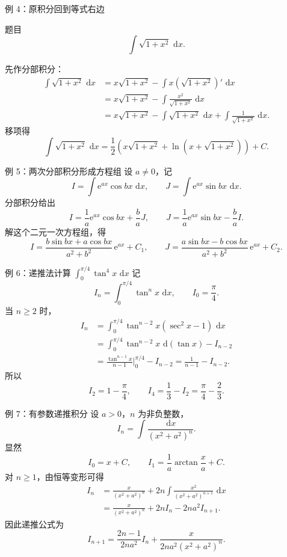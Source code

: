 \documentclass[aspectratio=169,10pt]{ctexbeamer}
\newcommand{\dd}{\,\mathrm{d}}
\newcommand{\ee}{\mathrm{e}}
\begin{document}
\begin{frame}[t]{例 4：原积分回到等式右边}
\small
\begin{block}{题目}
\[
  \int\sqrt{1+x^2}\,\dd x.
\]
\end{block}

先作分部积分：
\[
\begin{aligned}
\int\sqrt{1+x^2}\,\dd x
&=x\sqrt{1+x^2}-\int x(\sqrt{1+x^2})'\,\dd x\\
&=x\sqrt{1+x^2}-\int \frac{x^2}{\sqrt{1+x^2}}\,\dd x\\
&=x\sqrt{1+x^2}-\int \sqrt{1+x^2}\,\dd x
  +\int\frac{1}{\sqrt{1+x^2}}\,\dd x.
\end{aligned}
\]
移项得
\[
  \boxed{\int\sqrt{1+x^2}\,\dd x
  =\frac12\left(x\sqrt{1+x^2}+\ln(x+\sqrt{1+x^2})\right)+C.}
\]
\end{frame}

\begin{frame}[t]{例 5：两次分部积分形成方程组}
\small
设 $a\ne0$，记
\[
  I=\int \ee^{ax}\cos bx\,\dd x,\qquad
  J=\int \ee^{ax}\sin bx\,\dd x.
\]
分部积分给出
\[
  I=\frac1a\ee^{ax}\cos bx+\frac ba J,
\qquad
  J=\frac1a\ee^{ax}\sin bx-\frac ba I.
\]
解这个二元一次方程组，得
\[
\boxed{
I=\frac{b\sin bx+a\cos bx}{a^2+b^2}\,\ee^{ax}+C_1,
\qquad
J=\frac{a\sin bx-b\cos bx}{a^2+b^2}\,\ee^{ax}+C_2.
}
\]
\end{frame}

\begin{frame}[t]{例 6：递推法计算 $\int_0^{\pi/4}\tan^4x\,\dd x$}
\small
记
\[
  I_n=\int_0^{\pi/4}\tan^n x\,\dd x,\qquad I_0=\frac{\pi}{4}.
\]
当 $n\ge2$ 时，
\[
\begin{aligned}
I_n
&=\int_0^{\pi/4}\tan^{n-2}x(\sec^2x-1)\,\dd x\\
&=\int_0^{\pi/4}\tan^{n-2}x\,\dd(\tan x)-I_{n-2}\\
&=\frac{\tan^{n-1}x}{n-1}\bigg|_0^{\pi/4}-I_{n-2}
=\frac1{n-1}-I_{n-2}.
\end{aligned}
\]
所以
\[
  I_2=1-\frac{\pi}{4},\qquad
  I_4=\frac13-I_2=\frac{\pi}{4}-\frac23.
\]
\end{frame}

\begin{frame}[t]{例 7：有参数递推积分}
\small
设 $a>0$，$n$ 为非负整数，
\[
  I_n=\int\frac{\dd x}{(x^2+a^2)^n}.
\]
显然
\[
  I_0=x+C,\qquad I_1=\frac1a\arctan\frac{x}{a}+C.
\]
对 $n\ge1$，由恒等变形可得
\[
\begin{aligned}
I_n
&=\frac{x}{(x^2+a^2)^n}
  +2n\int\frac{x^2}{(x^2+a^2)^{n+1}}\,\dd x\\
&=\frac{x}{(x^2+a^2)^n}+2nI_n-2na^2I_{n+1}.
\end{aligned}
\]
因此递推公式为
\[
  \boxed{
  I_{n+1}
  =\frac{2n-1}{2na^2}I_n
  +\frac{x}{2na^2(x^2+a^2)^n}.}
\]
\end{frame}
\end{document}
